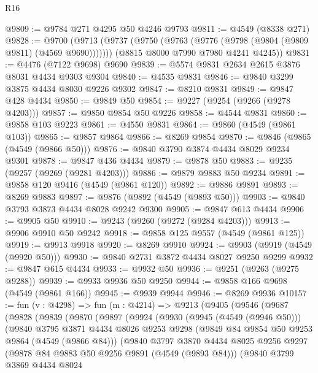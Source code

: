\begin{lexlean}{R16}
\begin{coremodule}
@9809 := @9784 @271 @4295 @50 @4246 @9793
@9811 := @4549 (@8338 @271)
@9828 := @9700
    (@9713
      (@9737 (@9750 (@9763 (@9776 (@9798 (@9804 (@9809 @9811) (@4569 @9690)))))))
      (@8815 @8000 @7990 @7980 @4241 @4245))
@9831 := @4476 (@7122 @9698) @9690
@9839 := @5574 @9831 @2634 @2615 @3876 @8031 @4434 @9303 @9304
@9840 := @4535 @9831
@9846 := @9840 @3299 @3875 @4434 @8030 @9226 @9302
@9847 := @8210 @9831
@9849 := @9847 @428 @4434
@9850 := @9849 @50
@9854 := @9227 (@9254 (@9266 (@9278 @4203)))
@9857 := @9850 @9854 @50 @9226
@9858 := @4544 @9831
@9860 := @9858 @103 @9223
@9861 := @4550 @9831
@9864 := @9860 (@4549 (@9861 @103))
@9865 := @9857 @9864
@9866 := @8269 @9854
@9870 := @9846 (@9865 (@4549 (@9866 @50)))
@9876 := @9840 @3790 @3874 @4434 @8029 @9234 @9301
@9878 := @9847 @436 @4434
@9879 := @9878 @50
@9883 := @9235 (@9257 (@9269 (@9281 @4203)))
@9886 := @9879 @9883 @50 @9234
@9891 := @9858 @120 @9416 (@4549 (@9861 @120))
@9892 := @9886 @9891
@9893 := @8269 @9883
@9897 := @9876 (@9892 (@4549 (@9893 @50)))
@9903 := @9840 @3793 @3873 @4434 @8028 @9242 @9300
@9905 := @9847 @613 @4434
@9906 := @9905 @50
@9910 := @9243 (@9260 (@9272 (@9284 @4203)))
@9913 := @9906 @9910 @50 @9242
@9918 := @9858 @125 @9557 (@4549 (@9861 @125))
@9919 := @9913 @9918
@9920 := @8269 @9910
@9924 := @9903 (@9919 (@4549 (@9920 @50)))
@9930 := @9840 @2731 @3872 @4434 @8027 @9250 @9299
@9932 := @9847 @615 @4434
@9933 := @9932 @50
@9936 := @9251 (@9263 (@9275 @9288))
@9939 := @9933 @9936 @50 @9250
@9944 := @9858 @166 @9698 (@4549 (@9861 @166))
@9945 := @9939 @9944
@9946 := @8269 @9936
@10157 := fun (v : @4298) =>
  fun (m : @4214) =>
  @9213
    (@9405
      (@9546
        (@9687
          (@9828
            (@9839
              (@9870
                (@9897
                  (@9924
                    (@9930
                      (@9945 (@4549 (@9946 @50)))
                      (@9840
                        @3795
                        @3871
                        @4434
                        @8026
                        @9253
                        @9298
                        (@9849 @84 @9854 @50 @9253 @9864 (@4549 (@9866 @84)))
                        (@9840
                          @3797
                          @3870
                          @4434
                          @8025
                          @9256
                          @9297
                          (@9878 @84 @9883 @50 @9256 @9891 (@4549 (@9893 @84)))
                          (@9840
                            @3799
                            @3869
                            @4434
                            @8024

\end{coremodule}
\end{lexlean}
